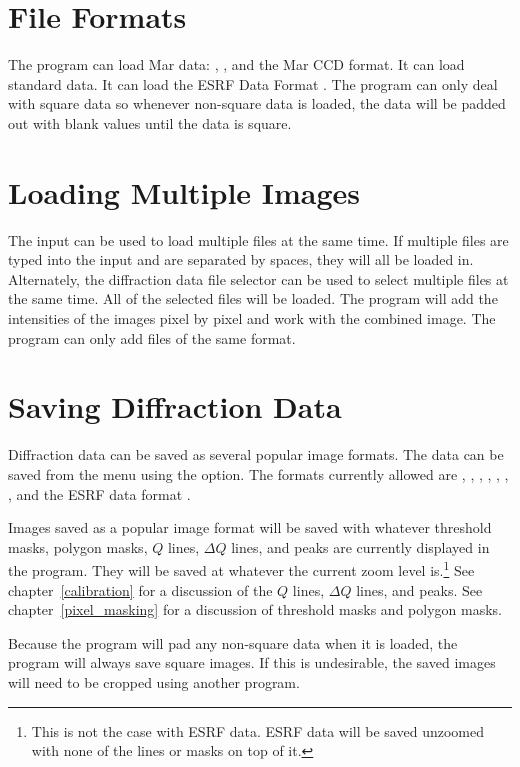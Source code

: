 \section{File Formats}

The program can load Mar data: , 
, and the  Mar CCD format.
It can load standard  data. 
It can load the ESRF Data Format .
The program can only deal with square data so whenever non-square
data is loaded, the data will be padded out with blank values
until the data is square.

\section{Loading Multiple Images}

The  input can be used to load multiple files
at the same time.
If multiple files are typed into the  input and
are separated by spaces, they will all be loaded in. 
Alternately, the diffraction data file 
selector can be used to select multiple files at the same time.
All of the selected files will be loaded.
The program will add the intensities of the images pixel by pixel 
and work with the combined image. The program can only add files 
of the same format.

\section{Saving Diffraction Data}

Diffraction data can be saved as several popular image formats. 
The data can be saved from the  menu using 
the  option. The formats currently allowed are , 
, , , , , , and 
the ESRF data format .

Images saved as a popular image format will be saved with whatever
threshold masks, polygon masks, $Q$ lines, $\Delta Q$ lines, and peaks 
are currently displayed in the program. They will be saved
at whatever the current zoom level is.\footnote{This is not the case with 
ESRF data. ESRF data will be saved unzoomed with none
of the lines or masks on top of it.} See chapter~\ref{calibration} for 
a discussion of the $Q$ lines, $\Delta Q$ lines, and peaks. See 
chapter~\ref{pixel_masking} for a discussion of threshold masks and 
polygon masks.

Because the program will pad any non-square data when
it is loaded, the program will always save square
images. If this is undesirable, the saved images
will need to be cropped using another program.

